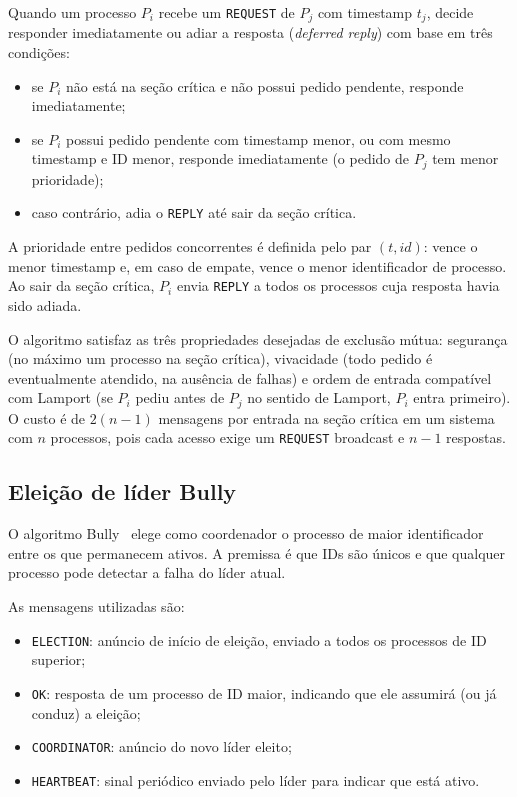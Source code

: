 \documentclass[10pt, a4paper, titlepage]{extarticle}
\begin{document}
Quando um processo $P_i$ recebe um \texttt{REQUEST} de $P_j$ com timestamp $t_j$, decide responder imediatamente ou adiar a resposta (\emph{deferred reply}) com base em três condições:

\begin{itemize}
  \item se $P_i$ não está na seção crítica e não possui pedido pendente, responde imediatamente;
  \item se $P_i$ possui pedido pendente com timestamp menor, ou com mesmo timestamp e ID menor, responde imediatamente (o pedido de $P_j$ tem menor prioridade);
  \item caso contrário, adia o \texttt{REPLY} até sair da seção crítica.
\end{itemize}

A prioridade entre pedidos concorrentes é definida pelo par $(t, \mathit{id})$: vence o menor timestamp e, em caso de empate, vence o menor identificador de processo. Ao sair da seção crítica, $P_i$ envia \texttt{REPLY} a todos os processos cuja resposta havia sido adiada.

O algoritmo satisfaz as três propriedades desejadas de exclusão mútua: segurança (no máximo um processo na seção crítica), vivacidade (todo pedido é eventualmente atendido, na ausência de falhas) e ordem de entrada compatível com Lamport (se $P_i$ pediu antes de $P_j$ no sentido de Lamport, $P_i$ entra primeiro). O custo é de $2(n - 1)$ mensagens por entrada na seção crítica em um sistema com $n$ processos, pois cada acesso exige um \texttt{REQUEST} broadcast e $n - 1$ respostas.

\subsection{Eleição de líder Bully}
O algoritmo Bully~\cite{garcia1982} elege como coordenador o processo de maior identificador entre os que permanecem ativos. A premissa é que IDs são únicos e que qualquer processo pode detectar a falha do líder atual.

As mensagens utilizadas são:

\begin{itemize}
  \item \texttt{ELECTION}: anúncio de início de eleição, enviado a todos os processos de ID superior;
  \item \texttt{OK}: resposta de um processo de ID maior, indicando que ele assumirá (ou já conduz) a eleição;
  \item \texttt{COORDINATOR}: anúncio do novo líder eleito;
  \item \texttt{HEARTBEAT}: sinal periódico enviado pelo líder para indicar que está ativo.
\end{itemize}
\end{document}
